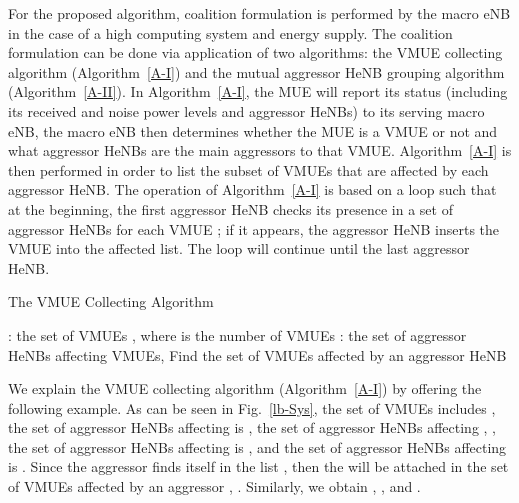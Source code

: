 \documentclass[paper]{ieice}
\begin{document}
For the proposed algorithm, coalition formulation is performed by the macro eNB in the case of a high computing system and energy supply. The coalition formulation can be done via application of two algorithms: the VMUE collecting algorithm (Algorithm~\ref{A-I}) and the  mutual aggressor HeNB grouping algorithm (Algorithm~\ref{A-II}). In Algorithm~\ref{A-I}, the MUE will report its status (including its received and noise power levels and aggressor HeNBs) to its serving  macro eNB, the  macro eNB then determines whether the MUE is a VMUE or not and what aggressor HeNBs are the main aggressors to that VMUE. Algorithm~\ref{A-I} is then performed in order to list the subset of VMUEs that are affected by each aggressor HeNB. The operation of Algorithm~\ref{A-I} is based on a loop such that at the beginning, the first aggressor HeNB checks its presence in a set of aggressor HeNBs for each VMUE ; if it appears, the aggressor HeNB inserts the VMUE  into the affected list. The loop will continue until the last aggressor HeNB.
\begin{algorithm}[ht]
\caption{The VMUE Collecting Algorithm}
\label{A-I}
\begin{algorithmic}
\STATE : the set of VMUEs , where  is the number of VMUEs
\STATE : the set of aggressor HeNBs affecting VMUEs, 
\STATE Find the set of VMUEs  affected by an aggressor HeNB 

\STATE 
{}
\IF{ }
\STATE 
\ENDIF
\ENDFOR
\ENDFOR
\end{algorithmic}
\end{algorithm}

We explain the VMUE collecting algorithm (Algorithm~\ref{A-I}) by offering the following example. As can be seen in Fig.~\ref{lb-Sys}, the set of VMUEs  includes , the set of aggressor HeNBs affecting  is , the set of aggressor HeNBs affecting , , the set of aggressor HeNBs affecting  is , and  the set of aggressor HeNBs affecting  is . Since the aggressor  finds itself in the list , then the  will be attached in the set of VMUEs affected by an aggressor , . Similarly, we obtain , , and .
\end{document}
